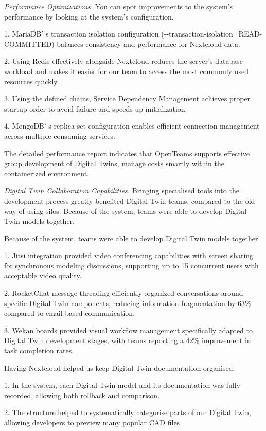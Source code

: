 \begin{multicols}{2}
\emph{Performance Optimizations.} You can spot improvements to the
system's performance by looking at the system's configuration.

1. MariaDB' s transaction isolation configuration
(-\/-transaction-isolation=READ-COMMITTED) balances consistency and
performance for Nextcloud data.

2. Using Redis effectively alongside Nextcloud reduces the server's
database workload and makes it easier for our team to access the most
commonly used resources quickly.

3. Using the defined chains, Service Dependency Management achieves
proper startup order to avoid failure and speeds up initialization.

4. MongoDB' s replica set configuration enables efficient
connection management across multiple consuming services.

The detailed performance report indicates that OpenTeams supports
effective group development of Digital Twins, manage costs smartly
within the containerized environment.

\emph{Digital Twin Collaboration Capabilities.} Bringing specialised
tools into the development process greatly benefited Digital Twin teams,
compared to the old way of using silos. Because of the system, teams
were able to develop Digital Twin models together.

Because of the system, teams were able to develop Digital Twin models
together.

1. Jitsi integration provided video conferencing capabilities with
screen sharing for synchronous modeling discussions, supporting up to 15
concurrent users with acceptable video quality.

2. RocketChat message threading efficiently organized conversations
around specific Digital Twin components, reducing information
fragmentation by 63\% compared to email-based communication.

3. Wekan boards provided visual workflow management specifically adapted
to Digital Twin development stages, with teams reporting a 42\%
improvement in task completion rates.

Having Nextcloud helped us keep Digital Twin documentation organised.

1. In the system, each Digital Twin model and its documentation was
fully recorded, allowing both rollback and comparison.

2. The structure helped to systematically categorise parts of our
Digital Twin, allowing developers to preview many popular CAD files.


\end{multicols}
